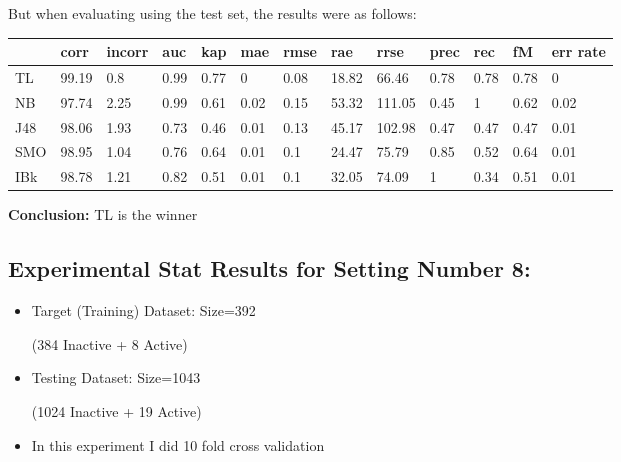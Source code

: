 \documentclass[a4paper,12pt, english]{article}
\begin{document}
But when evaluating using the test set, the results were as follows:
\begin{small}
\begin{center}
    \begin{tabular}{ | l | l | l | l | l | l | l | l | l | l | l | l | l |}
    \hline
      	& corr & incorr  & auc & kap & mae & rmse & rae & rrse & prec & rec & fM & err rate\\ \hline
      	TL & 99.19 & 0.8 & 0.99 & 0.77 & 0 & 0.08 & 18.82 & 66.46 & 0.78 & 0.78 & 0.78 & 0\\ \hline
	NB & 97.74 & 2.25 & 0.99 & 0.61 & 0.02 & 0.15 & 53.32 & 111.05 & 0.45 & 1 & 0.62 & 0.02\\ \hline
	J48 & 98.06 & 1.93 & 0.73 & 0.46 & 0.01 & 0.13 & 45.17 & 102.98 & 0.47 & 0.47 & 0.47 & 0.01\\ \hline
	SMO & 98.95 & 1.04 & 0.76 & 0.64 & 0.01 & 0.1 & 24.47 & 75.79 & 0.85 & 0.52 & 0.64 & 0.01\\ \hline
	IBk & 98.78 & 1.21 & 0.82 & 0.51 & 0.01 & 0.1 & 32.05 & 74.09 & 1 & 0.34 & 0.51 & 0.01\\ \hline  
    \end{tabular}       
\end{center}
\end{small}
\textbf{Conclusion:} TL is the winner

\newpage

\subsection{Experimental Stat Results for Setting Number 8:}
\begin{itemize}
\item Target (Training) Dataset: Size=392 \begin{scriptsize}(384 Inactive + 8 Active)\end{scriptsize} 
\item Testing Dataset: Size=1043 \begin{scriptsize}(1024 Inactive + 19 Active)\end{scriptsize}
\item In this experiment I did 10 fold cross validation
\end{itemize}  
\end{document}

